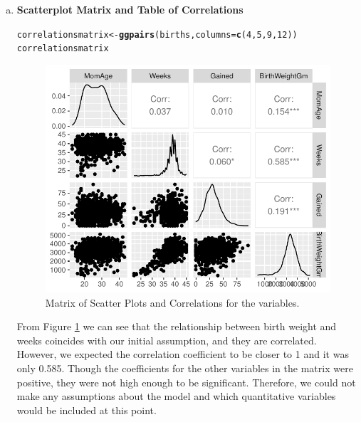 \documentclass{article}\usepackage[]{graphicx}\usepackage[]{xcolor}
\makeatletter
\def\maxwidth{ %
  \ifdim\Gin@nat@width>\linewidth
    \linewidth
  \else
    \Gin@nat@width
  \fi
}
\newcommand{\hlnum}[1]{\textcolor[rgb]{0.686,0.059,0.569}{#1}}%
\newcommand{\hlstd}[1]{\textcolor[rgb]{0.345,0.345,0.345}{#1}}%
\newcommand{\hlkwb}[1]{\textcolor[rgb]{0.69,0.353,0.396}{#1}}%
\newcommand{\hlkwc}[1]{\textcolor[rgb]{0.333,0.667,0.333}{#1}}%
\newcommand{\hlkwd}[1]{\textcolor[rgb]{0.737,0.353,0.396}{\textbf{#1}}}%
\newenvironment{kframe}{%
 \def\at@end@of@kframe{}%
 \ifinner\ifhmode%
  \def\at@end@of@kframe{\end{minipage}}%
  \begin{minipage}{\columnwidth}%
 \fi\fi%
 \def\FrameCommand##1{\hskip\@totalleftmargin \hskip-\fboxsep
 \colorbox{shadecolor}{##1}\hskip-\fboxsep
     \hskip-\linewidth \hskip-\@totalleftmargin \hskip\columnwidth}%
 \MakeFramed {\advance\hsize-\width
   \@totalleftmargin\z@ \linewidth\hsize
   \@setminipage}}%
 {\par\unskip\endMakeFramed%
 \at@end@of@kframe}
\newenvironment{knitrout}{}{} %
\makeatother
\begin{document}
\begin{enumerate}[a.]
\item\textbf{Scatterplot Matrix and Table of Correlations}
\begin{knitrout}
\color{fgcolor}\begin{kframe}
\begin{alltt}
\hlstd{correlationsmatrix} \hlkwb{<-} \hlkwd{ggpairs}\hlstd{(births,} \hlkwc{columns} \hlstd{=} \hlkwd{c}\hlstd{(}\hlnum{4}\hlstd{,}\hlnum{5}\hlstd{,}\hlnum{9}\hlstd{,}\hlnum{12}\hlstd{))}
\hlstd{correlationsmatrix}
\end{alltt}
\end{kframe}
\end{knitrout}

\begin{figure}[H]
\centering
\begin{knitrout}
\color{fgcolor}
\includegraphics[width=\maxwidth]{figure/unnamed-chunk-8-1} 
\end{knitrout}
\caption{Matrix of Scatter Plots and Correlations for the variables.}
\label{CorrelationSummary}
\end{figure}

From Figure \ref{CorrelationSummary} we can see that the relationship between birth weight and weeks coincides with our initial assumption, and they are correlated. However, we expected the correlation coefficient to be closer to 1 and it was only 0.585. Though the coefficients for the other variables in the matrix were positive, they were not high enough to be significant. Therefore, we could not make any assumptions about the model and which quantitative variables would be included at this point.

\end{enumerate} %
\end{document}

